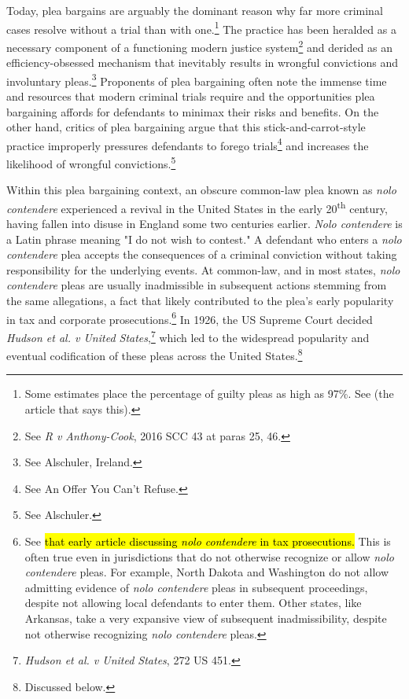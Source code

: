 Today, plea bargains are arguably the dominant reason why far more criminal cases resolve without a trial than with one.\footnote{Some estimates place the percentage of guilty pleas as high as 97\%. See (the article that says this).} The practice has been heralded as a necessary component of a functioning modern justice system\footnote{See \textit{R v Anthony-Cook}, 2016 SCC 43 at paras 25, 46.} and derided as an efficiency-obsessed mechanism that inevitably results in wrongful convictions and involuntary pleas.\footnote{See Alschuler, Ireland.} Proponents of plea bargaining often note the immense time and resources that modern criminal trials require and the opportunities plea bargaining affords for defendants to minimax their risks and benefits. On the other hand, critics of plea bargaining argue that this stick-and-carrot-style practice improperly pressures defendants to forego trials\footnote{See An Offer You Can't Refuse.} and increases the likelihood of wrongful convictions.\footnote{See Alschuler.}

Within this plea bargaining context, an obscure common-law plea known as \textit{nolo contendere} experienced a revival in the United States in the early 20\textsuperscript{th} century, having fallen into disuse in England some two centuries earlier. \textit{Nolo contendere} is a Latin phrase meaning "I do not wish to contest." A defendant who enters a \textit{nolo contendere} plea accepts the consequences of a criminal conviction without taking responsibility for the underlying events. At common-law, and in most states, \textit{nolo contendere} pleas are usually inadmissible in subsequent actions stemming from the same allegations, a fact that likely contributed to the plea's early popularity in tax and corporate prosecutions.\footnote{See \hl{that early article discussing \textit{nolo contendere} in tax prosecutions.} This is often true even in jurisdictions that do not otherwise recognize or allow \textit{nolo contendere} pleas. For example, North Dakota and Washington do not allow admitting evidence of \textit{nolo contendere} pleas in subsequent proceedings, despite not allowing local defendants to enter them. Other states, like Arkansas, take a very expansive view of subsequent inadmissibility, despite not otherwise recognizing \textit{nolo contendere} pleas.} In 1926, the US Supreme Court decided \textit{Hudson et al. v United States},\footnote{\textit{Hudson et al. v United States}, 272 US 451.} which led to the widespread popularity and eventual codification of these pleas across the United States.\footnote{Discussed below.}

